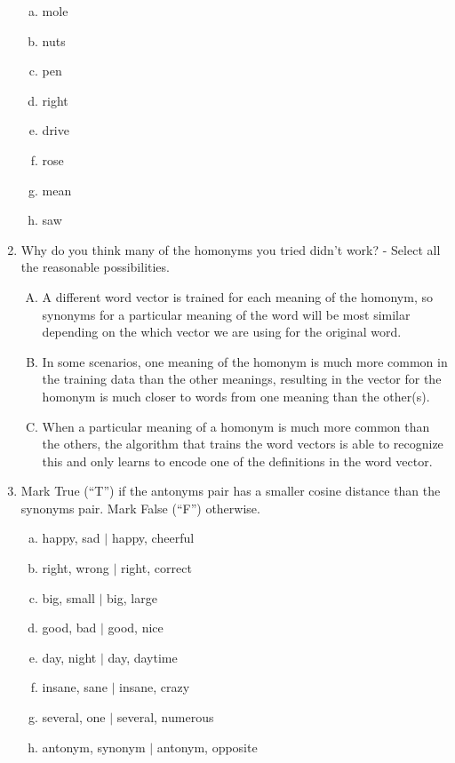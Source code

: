 \begin{enumerate}[1.]
\begin{enumerate}[a.]
\item mole
\item nuts
\item pen
\item right
\item drive
\item rose
\item mean
\item saw
\end{enumerate}

\item {}

Why do you think many of the homonyms you tried didn't work? - Select all the reasonable possibilities.

\begin{enumerate}[A)]
\item A different word vector is trained for each meaning of the homonym, so synonyms for a particular meaning of the word will be most similar depending on the which vector we are using for the original word.

\item In some scenarios, one meaning of the homonym is much more common in the training data than the other meanings, resulting in the vector for the homonym is much closer to words from one meaning than the other(s).

\item When a particular meaning of a homonym is much more common than the others, the algorithm that trains the word vectors is able to recognize this and only learns to encode one of the definitions in the word vector.
\end{enumerate}

\item {}

Mark True (``T'') if the antonyms pair has a smaller cosine distance than the synonyms pair. Mark False (``F'') otherwise. 
\begin{enumerate}[a.]
\item \textsf{happy, sad $\vert$ happy, cheerful}
\item \textsf{right, wrong $\vert$ right, correct}
\item \textsf{big, small $\vert$ big, large}
\item \textsf{good, bad $\vert$ good, nice}
\item \textsf{day, night $\vert$ day, daytime}
\item \textsf{insane, sane $\vert$ insane, crazy}
\item \textsf{several, one $\vert$ several, numerous}
\item \textsf{antonym, synonym $\vert$ antonym, opposite}
\end{enumerate}


\end{enumerate}
